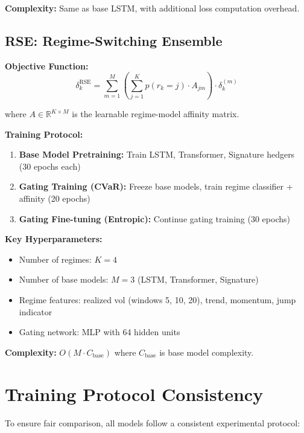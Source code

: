 \textbf{Complexity:} Same as base LSTM, with additional loss computation overhead.

\subsection{RSE: Regime-Switching Ensemble}

\textbf{Objective Function:}
\begin{equation}
    \delta_k^{\text{RSE}} = \sum_{m=1}^{M} \left(\sum_{j=1}^{K} p(r_k = j) \cdot A_{jm}\right) \cdot \delta_k^{(m)}
\end{equation}

where $A \in \mathbb{R}^{K \times M}$ is the learnable regime-model affinity matrix.

\textbf{Training Protocol:}
\begin{enumerate}[noitemsep]
    \item \textbf{Base Model Pretraining:} Train LSTM, Transformer, Signature hedgers (30 epochs each)
    \item \textbf{Gating Training (CVaR):} Freeze base models, train regime classifier + affinity (20 epochs)
    \item \textbf{Gating Fine-tuning (Entropic):} Continue gating training (30 epochs)
\end{enumerate}

\textbf{Key Hyperparameters:}
\begin{itemize}[noitemsep]
    \item Number of regimes: $K = 4$
    \item Number of base models: $M = 3$ (LSTM, Transformer, Signature)
    \item Regime features: realized vol (windows 5, 10, 20), trend, momentum, jump indicator
    \item Gating network: MLP with 64 hidden units
\end{itemize}

\textbf{Complexity:} $O(M \cdot C_{\text{base}})$ where $C_{\text{base}}$ is base model complexity.

\section{Training Protocol Consistency}
\label{app:training_protocol}

To ensure fair comparison, all models follow a consistent experimental protocol:

